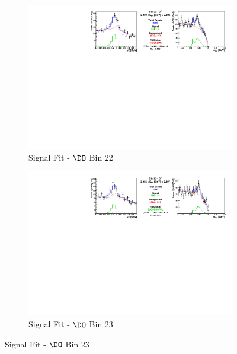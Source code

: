 \begin{figure}[h]

\begin{subfigure}[c]{0.99\textwidth}
\includegraphics[width=\textwidth]{figures/plots/fit_results/D0_bin_22.pdf}
\caption*{Signal Fit - $\DO$ Bin 22}
\end{subfigure}

\vspace{5pt}

\begin{subfigure}[c]{0.99\textwidth}
\includegraphics[width=\textwidth]{figures/plots/fit_results/D0_bin_23.pdf}
\caption*{Signal Fit - $\DO$ Bin 23}
\end{subfigure}

\vspace{5pt}


\end{figure}
